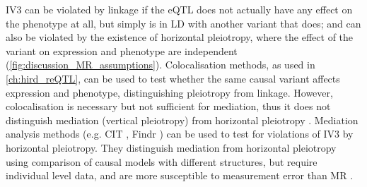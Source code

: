 IV3 can be violated by linkage if the eQTL does not actually have any effect on the phenotype at all, 
but simply is in \gls{LD} with another variant that does;
and can also be violated by the existence of horizontal pleiotropy, 
where the effect of the variant on expression and phenotype are independent (\cref{fig:discussion_MR_assumptions}).
Colocalisation methods, as used in \cref{ch:hird_reQTL}, can be used to test whether the same causal variant affects expression and phenotype, distinguishing pleiotropy from linkage.
However, colocalisation is necessary but not sufficient for mediation,
thus it does not distinguish mediation (vertical pleiotropy) from horizontal pleiotropy \autocite{hemani2018EvaluatingPotentialRole}.
%
Mediation analysis methods (e.g. CIT \autocite{millstein2009DisentanglingMolecularRelationships}, Findr \autocite{wang2017EfficientAccurateCausal}) can be used to test for violations of IV3 by horizontal pleiotropy.
They distinguish mediation from horizontal pleiotropy using comparison of causal models with different structures,
but require individual level data, and are more susceptible to measurement error than \gls{MR} \autocite{hemani2017OrientingCausalRelationship,hemani2018EvaluatingPotentialRole}.
%


